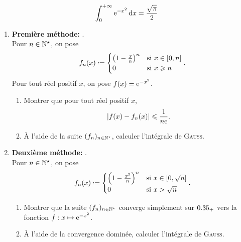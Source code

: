 \begin{prop}{}
    $$\int_{0}^{+\infty} \mathrm{e}^{-x^2} \, \mathrm{d} x = \frac{\sqrt{\pi}}{2}$$
\end{prop}

\begin{exercice}
    \begin{enumerate}
        \item \textbf{Première méthode:} . \\ 
        Pour $n \in \mathbb{N}^\star$, on pose
        $$
        f_n(x) \defeq
        \begin{cases}
            \left(1 - \frac{x}{n} \right)^n &\text{si } x \in [0, n] \\
            0 &\text{si } x \geqslant n
        \end{cases}.
        $$
        Pour tout réel positif $x$, on pose $f(x) = \mathrm{e}^{-x^2}$.
        \begin{enumerate}
            \item Montrer que pour tout réel positif $x$, 
            $$|f(x) - f_n(x)| \leqslant \frac{1}{n \mathrm{e}}.$$
            \item À l'aide de la suite $(f_n)_{n \in \mathbb{N}^\star}$, calculer l'intégrale de \textsc{Gauss}.
        \end{enumerate}
        \item \textbf{Deuxième méthode:} . \\
        Pour $n \in \mathbb{N}^\star$, on pose
        $$
        f_n(x) \defeq
        \begin{cases}
            \left(1 - \frac{x^2}{n} \right)^n &\text{si } x \in [0, \sqrt{n}] \\
            0 &\text{si } x > \sqrt{n}
        \end{cases}.
        $$
        \begin{enumerate}
            \item Montrer que la suite $(f_n)_{n \in \mathbb{N}^\star}$ converge simplement sur $0.35_+$ vers la fonction $f:x \mapsto \mathrm{e}^{-x^2}$.
            \item À l'aide de la convergence dominée, calculer l'intégrale de \textsc{Gauss}.
        \end{enumerate}
    \end{enumerate}
\end{exercice}

\begin{solution}
\end{solution}